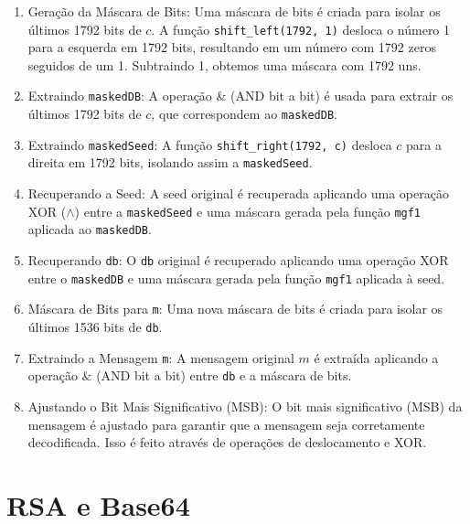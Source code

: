 \documentclass{article}
\begin{document}
    \begin{enumerate}
        \item Geração da Máscara de Bits:
        Uma máscara de bits é criada para isolar os últimos 1792 bits de \( c \). A função \texttt{shift\_left(1792, 1)} desloca o número 1 para a esquerda em 1792 bits, resultando em um número com 1792 zeros seguidos de um 1. Subtraindo 1, obtemos uma máscara com 1792 uns.
    
        \item Extraindo \texttt{maskedDB}:
        A operação \( \& \) (AND bit a bit) é usada para extrair os últimos 1792 bits de \( c \), que correspondem ao \texttt{maskedDB}.
    
        \item Extraindo \texttt{maskedSeed}:
        A função \texttt{shift\_right(1792, c)} desloca \( c \) para a direita em 1792 bits, isolando assim a \texttt{maskedSeed}.
    
        \item Recuperando a Seed:
        A seed original é recuperada aplicando uma operação XOR (\( \wedge \)) entre a \texttt{maskedSeed} e uma máscara gerada pela função \texttt{mgf1} aplicada ao \texttt{maskedDB}.
    
        \item Recuperando \texttt{db}:
        O \texttt{db} original é recuperado aplicando uma operação XOR entre o \texttt{maskedDB} e uma máscara gerada pela função \texttt{mgf1} aplicada à seed.
    
        \item Máscara de Bits para \texttt{m}:
        Uma nova máscara de bits é criada para isolar os últimos 1536 bits de \texttt{db}.
    
        \item Extraindo a Mensagem \texttt{m}:
        A mensagem original \( m \) é extraída aplicando a operação \( \& \) (AND bit a bit) entre \texttt{db} e a máscara de bits.
    
        \item Ajustando o Bit Mais Significativo (MSB):
        O bit mais significativo (MSB) da mensagem é ajustado para garantir que a mensagem seja corretamente decodificada. Isso é feito através de operações de deslocamento e XOR.
    \end{enumerate}

\section{ RSA e Base64 } 
\end{document}
